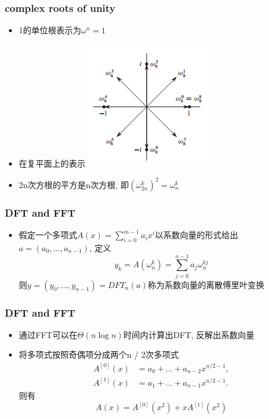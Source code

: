 \documentclass[cjk]{beamer}
\begin{document}
\begin{CJK*}{UTF8}{gbsn}
    \begin{frame}
      \frametitle{complex roots of unity}
      \begin{itemize}
        \item 1的单位根表示为$\omega^n = 1$
        \item 在复平面上的表示
          \newline
          \includegraphics[scale = 0.7]{3.png}
          \newline
        \item 2n次方根的平方是n次方根, 即$(\omega_{2n}^k)^2 = \omega_n^k$
      \end{itemize}
    \end{frame}

    \begin{frame}
      \frametitle{DFT and FFT}
      \begin{itemize}
        \item 假定一个多项式$A(x) = \sum\limits_{i = 0}^{m - 1}a_ix^i$以系数向量的形式给出$a = (a_0, ..., a_{n - 1})$, 定义
        \begin{equation*}
          y_k = A(\omega_n^k) = \sum_{j = 0}^{n - 1} a_j\omega_n^{kj}
        \end{equation*}
        则$y = (y_0, ..., y_{n - 1}) = DFT_n(a)$称为系数向量的离散傅里叶变换
      \end{itemize}
    \end{frame}

    \begin{frame}
      \frametitle{DFT and FFT}
      \begin{itemize}
        \item 通过FFT可以在$\Theta(n\log n)$时间内计算出DFT, 反解出系数向量
        \item 将多项式按照奇偶项分成两个n / 2次多项式
          \begin{equation*}
            \begin{split}
              A^{[0]}(x) &= a_0 + ... + a_{n - 2}x^{n / 2 - 1}, \\
              A^{[1]}(x) &= a_1 + ... + a_{n - 1}x^{n / 2 - 1}.
            \end{split}
          \end{equation*}
          则有
          \begin{equation*}
            A(x) = A^{[0]}(x^2) + xA^{[1]}(x^2)
          \end{equation*}
      \end{itemize}
    \end{frame}


\end{CJK*}
\end{document}
